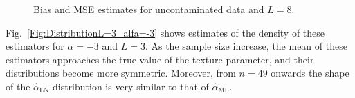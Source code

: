 \documentclass[twocolumn]{svjour3}
\begin{document}
\begin{figure}[hbt]
\centering
{}
\caption{Bias and MSE estimates for uncontaminated data and $L=8$.}\label{SesgoyECMSinContL=8} 
\end{figure}


Fig.~\ref{Fig:DistributionL=3_alfa=-3} shows estimates of the density of these estimators for $\alpha=-3$ and $L=3$. 
As the sample size increase, the mean of these estimators approaches the true value of the texture parameter, and their distributions become more symmetric. 
Moreover, from $n=49$ onwards the shape of the $\widehat{\alpha}_{\text{{LN}}}$ distribution is very similar to that of $\widehat{\alpha}_{\text{{ML}}}$.
\end{document}
